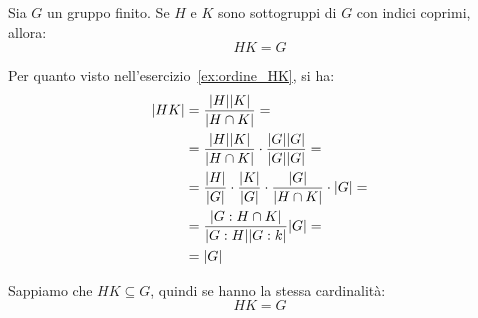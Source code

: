 \begin{esercizio}
	\label{ex:indici_coprimi}
	Sia $G$ un gruppo finito.
	Se $H$ e $K$ sono sottogruppi di $G$ con indici coprimi, allora:
	\begin{equation*}
		HK = G
	\end{equation*}
\end{esercizio}
\begin{soluzione}
	Per quanto visto nell'esercizio~\ref{ex:ordine_HK}, si ha:
	\begin{align*}
		\lvert HK \rvert 
		&= \dfrac{\lvert H \rvert\lvert K \rvert}{\lvert H \cap K \rvert} = \\
		&= \dfrac{\lvert H \rvert\lvert K \rvert}{\lvert H \cap K \rvert} \cdot \dfrac{\lvert G \rvert\lvert G \rvert}{\lvert G \rvert\lvert G \rvert} = \\
		&= \dfrac{\lvert H \rvert}{\lvert G \rvert} \cdot \dfrac{\lvert K \rvert}{\lvert G \rvert}\cdot\dfrac{\lvert G \rvert}{\lvert H \cap K \rvert} \cdot \lvert G \rvert = \\
		&= \dfrac{\lvert G:H \cap K \rvert}{\lvert G:H \rvert\lvert G:k \rvert}\lvert G \rvert = \\
		&= \lvert G \rvert
	\end{align*}

	Sappiamo che $HK \subseteq G$, quindi se hanno la stessa cardinalità:
	\begin{equation*}
		HK = G
	\end{equation*}
\end{soluzione}